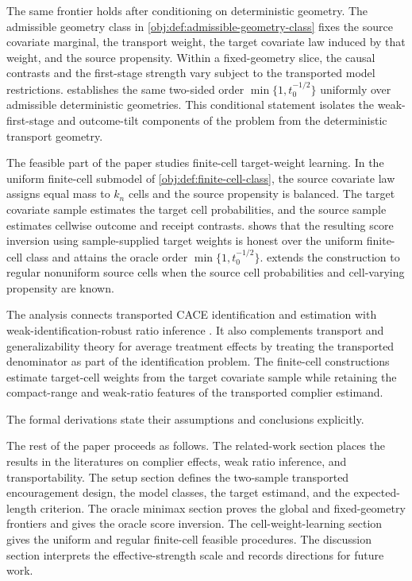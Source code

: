 The same frontier holds after conditioning on deterministic geometry. The admissible geometry class in \cref{obj:def:admissible-geometry-class} fixes the source covariate marginal, the transport weight, the target covariate law induced by that weight, and the source propensity. Within a fixed-geometry slice, the causal contrasts and the first-stage strength vary subject to the transported model restrictions.  establishes the same two-sided order \(\min\{1,t_0^{-1/2}\}\) uniformly over admissible deterministic geometries. This conditional statement isolates the weak-first-stage and outcome-tilt components of the problem from the deterministic transport geometry.

The feasible part of the paper studies finite-cell target-weight learning. In the uniform finite-cell submodel of \cref{obj:def:finite-cell-class}, the source covariate law assigns equal mass to \(k_n\) cells and the source propensity is balanced. The target covariate sample estimates the target cell probabilities, and the source sample estimates cellwise outcome and receipt contrasts.  shows that the resulting score inversion using sample-supplied target weights is honest over the uniform finite-cell class and attains the oracle order \(\min\{1,t_0^{-1/2}\}\).  extends the construction to regular nonuniform source cells when the source cell probabilities and cell-varying propensity are known.

The analysis connects transported CACE identification and estimation \citep{RudolphVanderLaan2017,ChenHuang2025} with weak-identification-robust ratio inference \citep{GleserHwang1987,Dufour1997,ChoiGuShen2018,ChoiShen2019,Ma2023,SmuclerLanniMasip2025}. It also complements transport and generalizability theory for average treatment effects \citep{HotzImbensMortimer2005,PearlBareinboim2011,BareinboimPearl2013,BareinboimPearl2016,DahabrehPetitoRobertson2020,Nguyen2017,ZengKennedyBodnarNaimi2024} by treating the transported denominator as part of the identification problem. The finite-cell constructions estimate target-cell weights from the target covariate sample while retaining the compact-range and weak-ratio features of the transported complier estimand.

The formal derivations state their assumptions and conclusions explicitly.

The rest of the paper proceeds as follows. The related-work section places the results in the literatures on complier effects, weak ratio inference, and transportability. The setup section defines the two-sample transported encouragement design, the model classes, the target estimand, and the expected-length criterion. The oracle minimax section proves the global and fixed-geometry frontiers and gives the oracle score inversion. The cell-weight-learning section gives the uniform and regular finite-cell feasible procedures. The discussion section interprets the effective-strength scale and records directions for future work.
